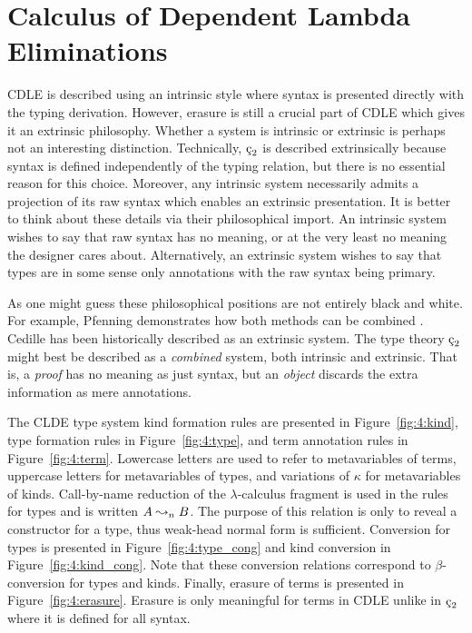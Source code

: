 \section{Calculus of Dependent Lambda Eliminations}

CDLE is described using an intrinsic style where syntax is presented directly with the typing derivation.
However, erasure is still a crucial part of CDLE which gives it an extrinsic philosophy.
Whether a system is intrinsic or extrinsic is perhaps not an interesting distinction.
Technically, $\ced$ is described extrinsically because syntax is defined independently of the typing relation, but there is no essential reason for this choice.
Moreover, any intrinsic system necessarily admits a projection of its raw syntax which enables an extrinsic presentation.
It is better to think about these details via their philosophical import.
An intrinsic system wishes to say that raw syntax has no meaning, or at the very least no meaning the designer cares about.
Alternatively, an extrinsic system wishes to say that types are in some sense only annotations with the raw syntax being primary.




As one might guess these philosophical positions are not entirely black and white.
For example, Pfenning demonstrates how both methods can be combined \cite{pfenning2008church}.
Cedille has been historically described as an extrinsic system.
The type theory $\ced$ might best be described as a \textit{combined} system, both intrinsic and extrinsic.
That is, a \textit{proof} has no meaning as just syntax, but an \textit{object} discards the extra information as mere annotations.

The CLDE type system kind formation rules are presented in Figure~\ref{fig:4:kind}, type formation rules in Figure~\ref{fig:4:type}, and term annotation rules in Figure~\ref{fig:4:term}.
Lowercase letters are used to refer to metavariables of terms, uppercase letters for metavariables of types, and variations of $\kappa$ for metavariables of kinds.
Call-by-name reduction of the $\lambda$-calculus fragment is used in the rules for types and is written $A \leadsto_n B$.
The purpose of this relation is only to reveal a constructor for a type, thus weak-head normal form is sufficient.
Conversion for types is presented in Figure~\ref{fig:4:type_cong} and kind conversion in Figure~\ref{fig:4:kind_cong}.
Note that these conversion relations correspond to $\beta$-conversion for types and kinds.
Finally, erasure of terms is presented in Figure~\ref{fig:4:erasure}.
Erasure is only meaningful for terms in CDLE unlike in $\ced$ where it is defined for all syntax.

